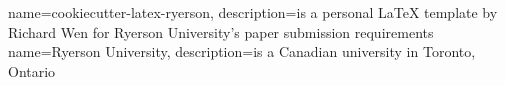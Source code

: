 \makeglossaries

{
	name={cookiecutter-latex-ryerso}n,
	description={is a personal LaTeX template by Richard Wen for Ryerson University's paper submission requirements}
}
{
	name={Ryerson University},
	description={is a Canadian university in Toronto, Ontario}
}